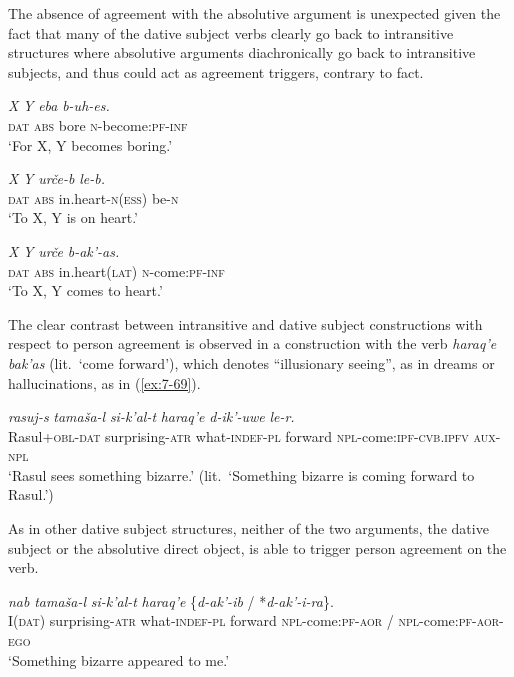 ﻿\documentclass[output=paper]{langsci/langscibook}
\begin{document}
The absence of agreement with the absolutive argument is 
unexpected given the fact that many of the dative subject verbs clearly
go back to intransitive structures where absolutive arguments
diachronically go back to intransitive subjects, and thus could act as
agreement triggers, contrary to fact.

\ea %
\ea %
\gll \emph{X} \emph{Y} \emph{eba} \emph{b-uh-es.}\\
\textsc{dat} \textsc{abs} bore \textsc{n}-become:\textsc{pf}-\textsc{inf}\\
\glt `For X, Y becomes boring.'

\ex %
\gll \emph{X} \emph{Y} \emph{urče-b} \emph{le-b.}\\
\textsc{dat} \textsc{abs} in.heart-\textsc{n}(\textsc{ess}) {be}-\textsc{n}\\
\glt `To X, Y is on heart.'

\ex %
\gll \emph{X} \emph{Y} \emph{urče} \emph{b-ak'-as.}\\
\textsc{dat} \textsc{abs} in.heart(\textsc{lat}) \textsc{n}-come:\textsc{pf}-\textsc{inf}\\
\glt `To X, Y comes to heart.'
\z
\z

The clear contrast between intransitive and dative subject constructions
with respect to person agreement is observed in a construction with the
verb \emph{haraq'e} \emph{bak'as} (lit.\ `come forward'), which denotes
``illusionary seeing'', as in dreams or hallucinations, as in (\ref{ex:7-69}).

\pagebreak

\ea\label{ex:7-69}
\gll \emph{rasuj-s} \emph{tamaša-l} \emph{si-k'al-t} \emph{haraq'e} \emph{d-ik'-uwe} \emph{le-r.}\\
Rasul+\textsc{obl}-\textsc{dat} surprising-\textsc{atr} what-\textsc{indef}-\textsc{pl} forward \textsc{npl}-come:\textsc{ipf}-\textsc{cvb.ipfv} \textsc{aux}-\textsc{npl}\\
\glt `Rasul sees something bizarre.' (lit.\ `Something bizarre is coming
forward to Rasul.')
\z

As in other dative subject structures, neither of the two arguments,
the dative subject or the absolutive direct object, is able to trigger
person agreement on the verb.

\ea %
\ea %
\gll \emph{nab} \emph{tamaša-l} \emph{si-k'al-t} \emph{haraq'e} \{\emph{d-ak'-ib} / *\emph{d-ak'-i-ra}\}.\\
I(\textsc{dat}) surprising-\textsc{atr} what-\textsc{indef}-\textsc{pl} forward \textsc{npl}-come:\textsc{pf}-\textsc{aor} / \textsc{npl}-come:\textsc{pf}-\textsc{aor}-\textsc{ego}\\
\glt `Something bizarre appeared to me.'
\end{document}
